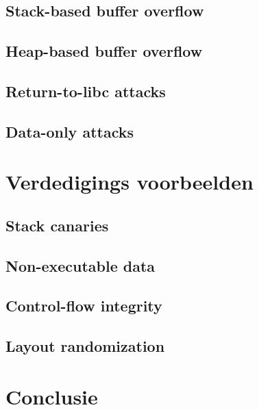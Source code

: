 \documentclass[../main.tex]{subfiles}
\begin{document}
\subsection{Stack-based buffer overflow}
\subsection{Heap-based buffer overflow}
\subsection{Return-to-libc attacks}
\subsection{Data-only attacks}
\section{Verdedigings voorbeelden}
\subsection{Stack canaries}
\subsection{Non-executable data}
\subsection{Control-flow integrity}
\subsection{Layout randomization}
\section{Conclusie}
\end{document}
